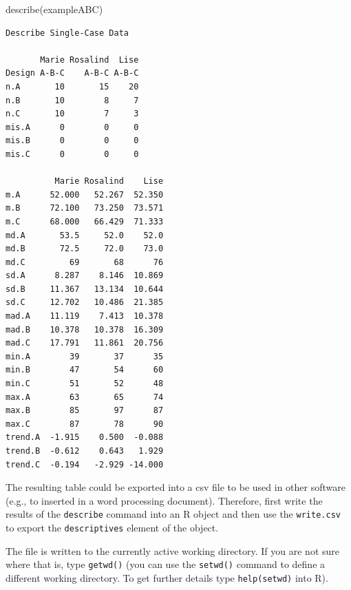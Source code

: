 \documentclass[
  letterpaper,
  DIV=11,
  numbers=noendperiod]{scrreprt}
\newenvironment{Shaded}{\begin{snugshade}}{\end{snugshade}}
\newcommand{\AttributeTok}[1]{\textcolor[rgb]{0.40,0.45,0.13}{#1}}
\newcommand{\CommentTok}[1]{\textcolor[rgb]{0.37,0.37,0.37}{#1}}
\newcommand{\FunctionTok}[1]{\textcolor[rgb]{0.28,0.35,0.67}{#1}}
\newcommand{\NormalTok}[1]{\textcolor[rgb]{0.00,0.23,0.31}{#1}}
\newcommand{\OtherTok}[1]{\textcolor[rgb]{0.00,0.23,0.31}{#1}}
\newcommand{\SpecialCharTok}[1]{\textcolor[rgb]{0.37,0.37,0.37}{#1}}
\newcommand{\StringTok}[1]{\textcolor[rgb]{0.13,0.47,0.30}{#1}}
\begin{document}
\begin{Shaded}
\begin{Highlighting}[]
\FunctionTok{describe}\NormalTok{(exampleABC)}
\end{Highlighting}
\end{Shaded}

\begin{verbatim}
Describe Single-Case Data

       Marie Rosalind  Lise
Design A-B-C    A-B-C A-B-C
n.A       10       15    20
n.B       10        8     7
n.C       10        7     3
mis.A      0        0     0
mis.B      0        0     0
mis.C      0        0     0

          Marie Rosalind    Lise
m.A      52.000   52.267  52.350
m.B      72.100   73.250  73.571
m.C      68.000   66.429  71.333
md.A       53.5     52.0    52.0
md.B       72.5     72.0    73.0
md.C         69       68      76
sd.A      8.287    8.146  10.869
sd.B     11.367   13.134  10.644
sd.C     12.702   10.486  21.385
mad.A    11.119    7.413  10.378
mad.B    10.378   10.378  16.309
mad.C    17.791   11.861  20.756
min.A        39       37      35
min.B        47       54      60
min.C        51       52      48
max.A        63       65      74
max.B        85       97      87
max.C        87       78      90
trend.A  -1.915    0.500  -0.088
trend.B  -0.612    0.643   1.929
trend.C  -0.194   -2.929 -14.000
\end{verbatim}

The resulting table could be exported into a csv file to be used in
other software (e.g., to inserted in a word processing document).
Therefore, first write the results of the \texttt{describe} command into
an R object and then use the \texttt{write.csv} to export the
\texttt{descriptives} element of the object.

\begin{Shaded}
\end{Shaded}

The file is written to the currently active working directory. If you
are not sure where that is, type \texttt{getwd()} (you can use the
\texttt{setwd()} command to define a different working directory. To get
further details type \texttt{help(setwd)} into R).
\end{document}
